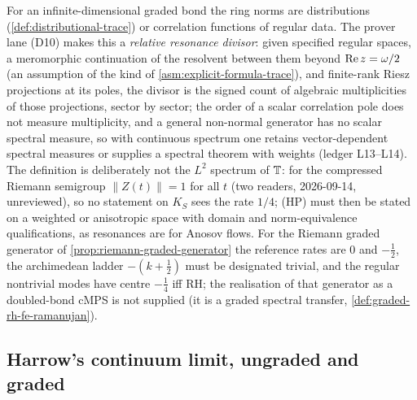 \begin{observation}
\label{obs:divisor-regular-data}
For an infinite-dimensional graded bond the ring norms are distributions
(\cref{def:distributional-trace}) or correlation functions of regular data. The prover lane (D10)
makes this a \emph{relative resonance divisor}: given specified regular spaces, a meromorphic
continuation of the resolvent between them beyond $\operatorname{Re} z = \omega/2$ (an assumption of the kind of
\cref{asm:explicit-formula-trace}), and finite-rank Riesz projections at its poles, the divisor is
the signed count of algebraic multiplicities of those projections, sector by sector; the order of
a scalar correlation pole does not measure multiplicity, and a general non-normal generator has no
scalar spectral measure, so with continuous spectrum one retains vector-dependent spectral measures
or supplies a spectral theorem with weights (ledger L13--L14). The definition is deliberately not the
$L^2$ spectrum of $\mathbb T$: for the compressed Riemann semigroup $\|Z(t)\| = 1$ for all $t$ (two
readers, 2026-09-14, unreviewed), so no statement on $K_S$ sees the rate $1/4$; (HP) must then be
stated on a weighted or anisotropic space with domain and norm-equivalence qualifications, as
resonances are for Anosov flows. For the Riemann graded generator of \cref{prop:riemann-graded-generator}
the reference rates are $0$ and $-\tfrac12$, the archimedean ladder $-(k+\tfrac12)$ must be
designated trivial, and the regular nontrivial modes have centre $-\tfrac14$ iff RH; the realisation
of that generator as a doubled-bond cMPS is not supplied (it is a graded spectral transfer,
\cref{def:graded-rh-fe-ramanujan}).
\end{observation}

\subsection{Harrow's continuum limit, ungraded and graded}

